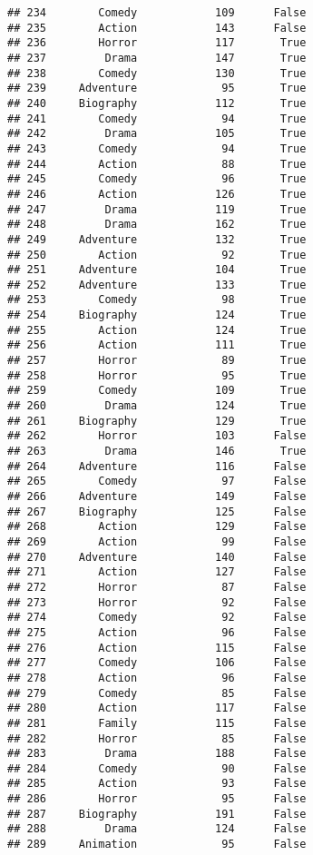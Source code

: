 \documentclass[
]{article}
\begin{document}
\begin{verbatim}
## 234        Comedy            109      False
## 235        Action            143      False
## 236        Horror            117       True
## 237         Drama            147       True
## 238        Comedy            130       True
## 239     Adventure             95       True
## 240     Biography            112       True
## 241        Comedy             94       True
## 242         Drama            105       True
## 243        Comedy             94       True
## 244        Action             88       True
## 245        Comedy             96       True
## 246        Action            126       True
## 247         Drama            119       True
## 248         Drama            162       True
## 249     Adventure            132       True
## 250        Action             92       True
## 251     Adventure            104       True
## 252     Adventure            133       True
## 253        Comedy             98       True
## 254     Biography            124       True
## 255        Action            124       True
## 256        Action            111       True
## 257        Horror             89       True
## 258        Horror             95       True
## 259        Comedy            109       True
## 260         Drama            124       True
## 261     Biography            129       True
## 262        Horror            103      False
## 263         Drama            146       True
## 264     Adventure            116      False
## 265        Comedy             97      False
## 266     Adventure            149      False
## 267     Biography            125      False
## 268        Action            129      False
## 269        Action             99      False
## 270     Adventure            140      False
## 271        Action            127      False
## 272        Horror             87      False
## 273        Horror             92      False
## 274        Comedy             92      False
## 275        Action             96      False
## 276        Action            115      False
## 277        Comedy            106      False
## 278        Action             96      False
## 279        Comedy             85      False
## 280        Action            117      False
## 281        Family            115      False
## 282        Horror             85      False
## 283         Drama            188      False
## 284        Comedy             90      False
## 285        Action             93      False
## 286        Horror             95      False
## 287     Biography            191      False
## 288         Drama            124      False
## 289     Animation             95      False

\end{verbatim}
\end{document}
